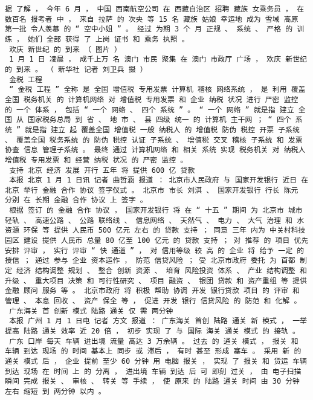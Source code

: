 \documentclass{article}
\begin{document}
\begin{Verbatim}[commandchars=\\\{\}]
 据 了解 ， 今年 6 月 ， 中国 西南航空公司 在 西藏自治区 招聘 藏族 女乘务员 ， 在 数百名 报考者 中 ， 来自 拉萨 的 次央 等 15 名 藏族 姑娘 幸运地 成为 雪域 高原 第一批 令人羡慕 的 “ 空中小姐 ” 。 经过 为期 3 个 月 正规 、 系统 、 严格 的 训练 ， 她们 全部 获得 了 上岗 证书 和 乘务 执照 。 
 欢庆 新世纪 的 到来 （ 图片 ） 
 1 月 1 日 凌晨 ， 成千上万 名 澳门 市民 聚集 在 澳门 市政厅 广场 ， 欢庆 新世纪 的 到来 。 （ 新华社 记者 刘卫兵 摄 ） 
 金税 工程 
 “ 金税 工程 ” 全称 是 全国 增值税 专用发票 计算机 稽核 网络系统 ， 是 利用 覆盖全国 税务机关 的 计算机网络 对 增值税 专用发票 和 企业 纳税 状况 进行 严密 监控 的 一个 体系 ， 包括 “ 一个 网络 、 四个 系统 ” 。 “ 一个 网络 ” 就是指 建立 全国 从 国家税务总局 到 省 、 地 市 、 县 四级 统一 的 计算机 主干网 ； “ 四个 系统 ” 就是指 建立 起 覆盖全国 增值税 一般 纳税人 的 增值税 防伪 税控 开票 子系统 、 覆盖全国 税务系统 的 防伪 税控 认证 子系统 、 增值税 交叉 稽核 子系统 和 发票 协查 信息 管理子系统 。 最终 通过 计算机网络 和 相关 系统 实现 税务机关 对 纳税人 增值税 专用发票 和 经营 纳税 状况 的 严密 监控 。 
 支持 北京 经济 发展 开行 五年 将 提供 600 亿 贷款 
 本报 北京 1 月 1 日讯 记者 曲哲涵 报道 ： 北京市人民政府 与 国家开发银行 近日 在 北京 举行 金融 合作 协议 签字仪式 。 北京市 市长 刘淇 、 国家开发银行 行长 陈元 分别 在 长期 金融 合作 协议 上 签字 。 
 根据 签订 的 金融 合作 协议 ， 国家开发银行 将 在 “ 十五 ” 期间 为 北京市 城市 轻轨 、 高速公路 、 公路 联络线 、 信息网络 、 天然气 、 电力 、 大气 治理 和 水资源 环保 等 提供 人民币 500 亿元 左右 的 贷款 支持 ； 同意 三年 内为 中关村科技园区 建设 提供 人民币 总量 80 亿至 100 亿元 的 贷款 支持 ； 对 推荐 的 项目 优先 安排 评审 ， 实行 评审 “ 快 通道 ” ， 对 信用等级 较 高 的 企业 将 给予 一定 的 授信 ； 通过 参与 企业 资本运作 ， 防范 信贷风险 ； 受 北京市政府 委托 为 首都 制定 经济 结构调整 规划 、 整合 创新 资源 、 培育 风险投资 体系 、 产业 结构调整 和 升级 、 重大项目 决策 和 可行性研究 、 项目 融资 、 银团 贷款 和 资产重组 等 提供 金融 顾问 服务 等 。 北京市政府 将 积极 帮助 协调 开发 银行贷款 项目 的 评审 和 管理 、 本息 回收 、 资产 保全 等 ， 促进 开发 银行 信贷风险 的 防范 和 化解 。 
 广东海关 首 创新 模式 陆路 通关 仅 需 两分钟 
 本报 广州 1 月 1 日电 记者 方文 报道 ： 广东海关 首创 陆路 通关 新 模式 ， 一举 提高 陆路 通关 效率 近 20 倍 ， 初步 实现 了 与 国际 海关 通关 模式 的 接轨 。 
 广东 口岸 每天 车辆 进出境 流量 高达 3 万余辆 。 过去 的 通关 模式 ， 报关 和 车辆 到达 现场 的 时间 基本上 同步 或 滞后 ， 有时 甚至 形成 塞车 。 采用 新 的 通关 模式 后 ， 企业 提前 至少 60 分钟 用 电脑 报关 ， 实现 了 报关 和 货运 车辆 到达 现场 在 时间 上 的 分离 ， 进出境 车辆 到达 后 可 即刻 过关 ， 由 电子扫描 瞬间 完成 报关 、 审核 、 转关 等 手续 ， 使 原来 的 陆路 通关 时间 由 30 分钟 左右 缩短 到 两分钟 以内 。 

\end{Verbatim}
\end{document}

